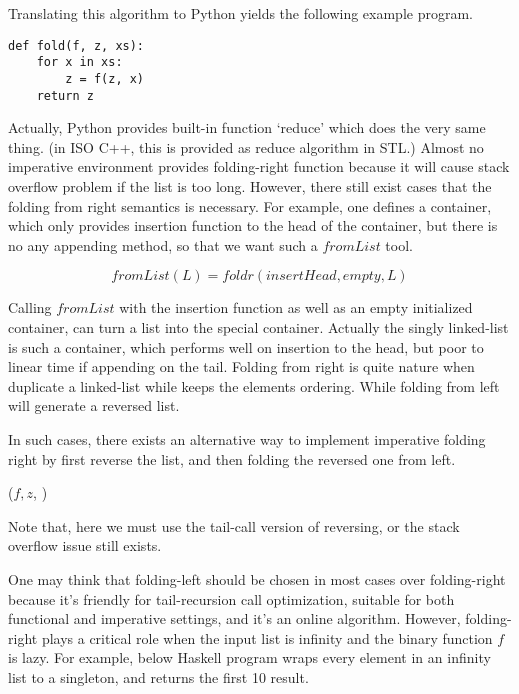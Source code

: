 \documentclass[UTF8]{article}
\begin{document}
Translating this algorithm to Python yields the following example program.

\lstset{language=Python}
\begin{lstlisting}
def fold(f, z, xs):
    for x in xs:
        z = f(z, x)
    return z
\end{lstlisting}

Actually, Python provides built-in function `reduce' which does the very same thing. (in ISO C++, this is
provided as reduce algorithm in STL.) Almost no imperative environment provides folding-right function because
it will cause stack overflow problem if the list is too long. However, there still exist cases that the folding from right
semantics is necessary. For example, one defines a container, which only provides insertion function to
the head of the container, but there is no any appending method, so that we want such a $fromList$
tool.

\[
fromList(L) = foldr(insertHead, empty, L)
\]

Calling $fromList$ with the insertion function as well as an empty initialized container, can turn a list
into the special container. Actually the singly linked-list is such a container, which performs well
on insertion to the head, but poor to linear time if appending on the tail. Folding from right is quite
nature when duplicate a linked-list while keeps the elements ordering. While folding from left will generate
a reversed list.

In such cases, there exists an alternative way to implement imperative folding right by first reverse the list, and then
folding the reversed one from left.

\begin{algorithmic}[1]
  \State \Return {}($f, z$, )
\EndFunction
\end{algorithmic}

Note that, here we must use the tail-call version of reversing, or the stack overflow issue still exists.

One may think that folding-left should be chosen in most cases over folding-right because it's friendly for
tail-recursion call optimization, suitable for both functional and imperative settings, and it's an online
algorithm. However, folding-right plays a critical role when the input list is infinity and the binary function
$f$ is lazy. For example, below Haskell program wraps every element in an infinity list to a singleton, and
returns the first 10 result.
\end{document}
